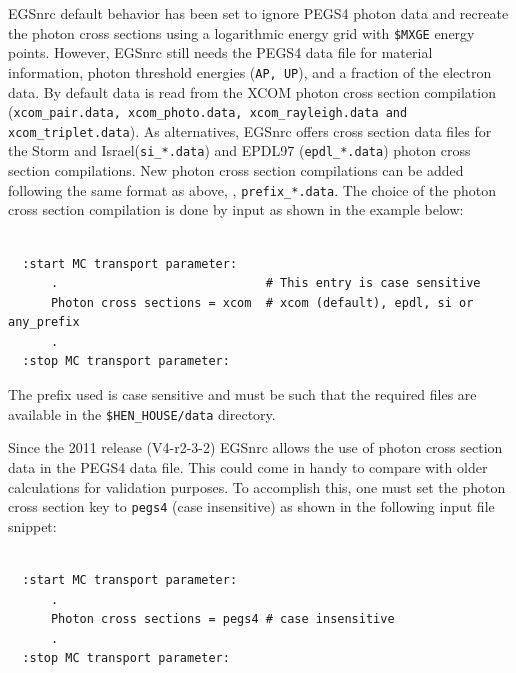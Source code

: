 EGSnrc default behavior has been set to ignore PEGS4 photon
data and recreate the photon cross sections using a logarithmic energy
grid with {\tt \$MXGE} energy points. However, EGSnrc still needs the
PEGS4 data file for material information, photon threshold energies
({\tt AP, UP}), and a fraction of the electron data.
By default data is read from the XCOM\cite{HS95} photon cross section
compilation ({\tt xcom\_pair.data, xcom\_photo.data, xcom\_rayleigh.data and
xcom\_triplet.data}). As alternatives, EGSnrc offers cross section data files
for the Storm and Israel\cite{SI70}({\tt si\_*.data}) and EPDL97\cite{Cu89}
({\tt epdl\_*.data}) photon cross section compilations.
New photon cross section compilations can be added following the
same format as above, \ie, {\tt prefix\_*.data}.
The choice of the photon cross section
compilation is done by input as shown in the example below:
\begin{verbatim}

  :start MC transport parameter:
      .                             # This entry is case sensitive
      Photon cross sections = xcom  # xcom (default), epdl, si or any_prefix
      .
  :stop MC transport parameter:

\end{verbatim}
The prefix used is case sensitive and must be such that the required files
are available in the {\tt \$HEN\_HOUSE/data} directory.

Since the 2011 release (V4-r2-3-2) EGSnrc allows the
use of photon cross section data in the PEGS4 data file. This could
come in handy to compare with older calculations for validation
purposes. To accomplish this, one must set the photon cross section key to
{\tt pegs4} (case insensitive) as shown in the following input file snippet:
\begin{verbatim}

  :start MC transport parameter:
      .
      Photon cross sections = pegs4 # case insensitive
      .
  :stop MC transport parameter:

\end{verbatim}
